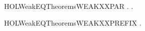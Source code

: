 \newcommand{\HOLWeakEQTheoremsWEAKXXEQUIVXXWEAKXXTRANSXXtauYY}{\UseVerbatim{HOLWeakEQTheoremsWEAKXXEQUIVXXWEAKXXTRANSXXtauYY}}
\begin{SaveVerbatim}{HOLWeakEQTheoremsWEAKXXPAR}
\HOLTokenTurnstile{} \HOLSymConst{\HOLTokenForall{}}  .
        \HOLTokenWeakTransBegin{}\HOLTokenWeakTransEnd {} \HOLSymConst{\HOLTokenImp{}}
       \HOLSymConst{\HOLTokenForall{}}.  \HOLSymConst{\ensuremath{\mid}}  \HOLTokenWeakTransBegin{}\HOLTokenWeakTransEnd {} \HOLSymConst{\ensuremath{\mid}}  \HOLSymConst{\HOLTokenConj{}}  \HOLSymConst{\ensuremath{\mid}}  \HOLTokenWeakTransBegin{}\HOLTokenWeakTransEnd {} \HOLSymConst{\ensuremath{\mid}} 
\end{SaveVerbatim}
\newcommand{\HOLWeakEQTheoremsWEAKXXPAR}{\UseVerbatim{HOLWeakEQTheoremsWEAKXXPAR}}
\begin{SaveVerbatim}{HOLWeakEQTheoremsWEAKXXPREFIX}
\HOLTokenTurnstile{} \HOLSymConst{\HOLTokenForall{}} . \HOLSymConst{\ensuremath{\ldotp}} \HOLTokenWeakTransBegin{}\HOLTokenWeakTransEnd {}
\end{SaveVerbatim}
\newcommand{\HOLWeakEQTheoremsWEAKXXPREFIX}{\UseVerbatim{HOLWeakEQTheoremsWEAKXXPREFIX}}
